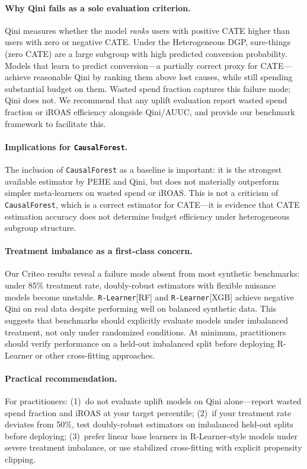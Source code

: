 \documentclass[10pt]{article}
\newcommand{\rlearner}{\texttt{R-Learner}\xspace}
\newcommand{\causalforest}{\texttt{CausalForest}\xspace}
\begin{document}
\paragraph{Why Qini fails as a sole evaluation criterion.}
Qini measures whether the model \emph{ranks} users with positive CATE higher
than users with zero or negative CATE. Under the Heterogeneous DGP, sure-things
(zero CATE) are a large subgroup with high predicted conversion probability.
Models that learn to predict conversion---a partially correct proxy for CATE---
achieve reasonable Qini by ranking them above lost causes, while still spending
substantial budget on them. Wasted spend fraction captures this failure mode;
Qini does not. We recommend that any uplift evaluation report wasted spend
fraction or iROAS efficiency alongside Qini/AUUC, and provide our benchmark
framework to facilitate this.

\paragraph{Implications for \causalforest.}
The inclusion of \causalforest as a baseline is important: it is the
strongest available estimator by PEHE and Qini, but does not materially
outperform simpler meta-learners on wasted spend or iROAS. This is not a
criticism of \causalforest, which is a correct estimator for CATE---it is
evidence that CATE estimation accuracy does not determine budget efficiency
under heterogeneous subgroup structure.

\paragraph{Treatment imbalance as a first-class concern.}
Our Criteo results reveal a failure mode absent from most synthetic benchmarks:
under 85\% treatment rate, doubly-robust estimators with flexible nuisance
models become unstable. \rlearner[RF] and \rlearner[XGB] achieve negative Qini
on real data despite performing well on balanced synthetic data. This suggests
that benchmarks should explicitly evaluate models under imbalanced treatment,
not only under randomized conditions. At minimum, practitioners should verify
performance on a held-out imbalanced split before deploying R-Learner or other
cross-fitting approaches.

\paragraph{Practical recommendation.}
For practitioners: (1)~do not evaluate uplift models on Qini alone---report
wasted spend fraction and iROAS at your target percentile; (2)~if your
treatment rate deviates from 50\%, test doubly-robust estimators on imbalanced
held-out splits before deploying; (3)~prefer linear base learners in
R-Learner-style models under severe treatment imbalance, or use stabilized
cross-fitting with explicit propensity clipping.
\end{document}
